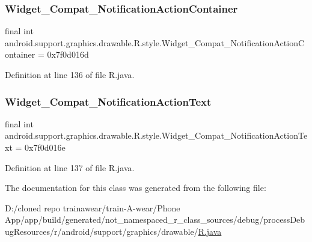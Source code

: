 \mbox{\label{classandroid_1_1support_1_1graphics_1_1drawable_1_1_r_1_1style_a1d8f04477885f72e43116dd03c334cfd}} 
\subsubsection{\texorpdfstring{Widget\_Compat\_NotificationActionContainer}{Widget\_Compat\_NotificationActionContainer}}
{\footnotesize\ttfamily final int android.\+support.\+graphics.\+drawable.\+R.\+style.\+Widget\+\_\+\+Compat\+\_\+\+Notification\+Action\+Container = 0x7f0d016d\hspace{0.3cm}{\ttfamily [static]}}



Definition at line 136 of file R.\+java.

\mbox{\label{classandroid_1_1support_1_1graphics_1_1drawable_1_1_r_1_1style_a490bf3c12ac2da8140c682ca1cda94ed}} 
\subsubsection{\texorpdfstring{Widget\_Compat\_NotificationActionText}{Widget\_Compat\_NotificationActionText}}
{\footnotesize\ttfamily final int android.\+support.\+graphics.\+drawable.\+R.\+style.\+Widget\+\_\+\+Compat\+\_\+\+Notification\+Action\+Text = 0x7f0d016e\hspace{0.3cm}{\ttfamily [static]}}



Definition at line 137 of file R.\+java.



The documentation for this class was generated from the following file\+:\begin{DoxyCompactItemize}
\item 
D\+:/cloned repo trainawear/train-\/\+A-\/wear/\+Phone App/app/build/generated/not\+\_\+namespaced\+\_\+r\+\_\+class\+\_\+sources/debug/process\+Debug\+Resources/r/android/support/graphics/drawable/\mbox{\hyperlink{process_debug_resources_2r_2android_2support_2graphics_2drawable_2_r_8java}{R.\+java}}\end{DoxyCompactItemize}
